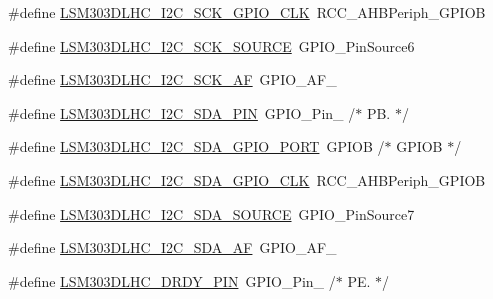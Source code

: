 \begin{DoxyCompactItemize}
\item 
\#define \hyperlink{group__STM32F3__DISCOVERY__LSM303DLHC__Exported__Constants_ga21744353d4a80adb33efda1c9860e608}{L\+S\+M303\+D\+L\+H\+C\+\_\+\+I2\+C\+\_\+\+S\+C\+K\+\_\+\+G\+P\+I\+O\+\_\+\+C\+L\+K}~R\+C\+C\+\_\+\+A\+H\+B\+Periph\+\_\+\+G\+P\+I\+O\+B
\item 
\#define \hyperlink{group__STM32F3__DISCOVERY__LSM303DLHC__Exported__Constants_gae878c4a4500dba04f46195f71647b5d9}{L\+S\+M303\+D\+L\+H\+C\+\_\+\+I2\+C\+\_\+\+S\+C\+K\+\_\+\+S\+O\+U\+R\+C\+E}~G\+P\+I\+O\+\_\+\+Pin\+Source6
\item 
\#define \hyperlink{group__STM32F3__DISCOVERY__LSM303DLHC__Exported__Constants_gaa6f9c11cd6c6018de7ce7fceb793de09}{L\+S\+M303\+D\+L\+H\+C\+\_\+\+I2\+C\+\_\+\+S\+C\+K\+\_\+\+A\+F}~G\+P\+I\+O\+\_\+\+A\+F\+\_
\item 
\#define \hyperlink{group__STM32F3__DISCOVERY__LSM303DLHC__Exported__Constants_ga15b1a5413882eef873a8789d09a1982f}{L\+S\+M303\+D\+L\+H\+C\+\_\+\+I2\+C\+\_\+\+S\+D\+A\+\_\+\+P\+I\+N}~G\+P\+I\+O\+\_\+\+Pin\+\_                  /$\ast$ P\+B. $\ast$/
\item 
\#define \hyperlink{group__STM32F3__DISCOVERY__LSM303DLHC__Exported__Constants_ga906f5a1b1f205b4fead3edaa3c8a64d0}{L\+S\+M303\+D\+L\+H\+C\+\_\+\+I2\+C\+\_\+\+S\+D\+A\+\_\+\+G\+P\+I\+O\+\_\+\+P\+O\+R\+T}~G\+P\+I\+O\+B                       /$\ast$ G\+P\+I\+O\+B $\ast$/
\item 
\#define \hyperlink{group__STM32F3__DISCOVERY__LSM303DLHC__Exported__Constants_gaed276293da4ac237725a841ccc6e6566}{L\+S\+M303\+D\+L\+H\+C\+\_\+\+I2\+C\+\_\+\+S\+D\+A\+\_\+\+G\+P\+I\+O\+\_\+\+C\+L\+K}~R\+C\+C\+\_\+\+A\+H\+B\+Periph\+\_\+\+G\+P\+I\+O\+B
\item 
\#define \hyperlink{group__STM32F3__DISCOVERY__LSM303DLHC__Exported__Constants_ga4540334975240cee0bfb264791b65e3e}{L\+S\+M303\+D\+L\+H\+C\+\_\+\+I2\+C\+\_\+\+S\+D\+A\+\_\+\+S\+O\+U\+R\+C\+E}~G\+P\+I\+O\+\_\+\+Pin\+Source7
\item 
\#define \hyperlink{group__STM32F3__DISCOVERY__LSM303DLHC__Exported__Constants_gaf67dc0bf7f62e9fb7f2461e2f3b7c368}{L\+S\+M303\+D\+L\+H\+C\+\_\+\+I2\+C\+\_\+\+S\+D\+A\+\_\+\+A\+F}~G\+P\+I\+O\+\_\+\+A\+F\+\_
\item 
\#define \hyperlink{group__STM32F3__DISCOVERY__LSM303DLHC__Exported__Constants_ga5c42925a6f0672905f4d639d87d1a532}{L\+S\+M303\+D\+L\+H\+C\+\_\+\+D\+R\+D\+Y\+\_\+\+P\+I\+N}~G\+P\+I\+O\+\_\+\+Pin\+\_                  /$\ast$ P\+E. $\ast$/
\item 

\end{DoxyCompactItemize}
